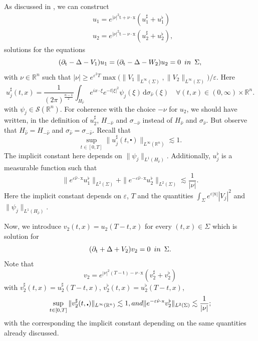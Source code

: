 \documentclass[10pt,a4paper]{amsart}
\newcommand{\R}{\mathbb{R}}
\newcommand{\dd}{\mathrm{d}}
\newcommand{\tm}{\mathrm{t}}
\newcommand{\x}{\mathrm{x}}
\begin{document}
As discussed in , 
we can construct
\begin{align*}
& u_1 = e^{|\nu|^2 \tm + \nu \cdot \x} (u_1^\sharp + u_1^\flat)\\
& u_2 = e^{|\nu|^2 \tm - \nu \cdot \x} (u_2^\sharp + u_2^\flat),
\end{align*}
solutions for the equations
\begin{equation*}
(\partial_\tm - \Delta - V_1) u_1 = (\partial_\tm - \Delta - W_2) u_2 = 0 \enspace \textnormal{in} \enspace \Sigma,
\end{equation*}
with $\nu \in \R^n $ such that 
$|\nu| \geq e^{\varepsilon^2 T} \max\big(\| V_1 \|_{L^\infty (\Sigma)}, \| V_2 \|_{L^\infty (\Sigma)}\big)/\varepsilon$. Here
\begin{equation*}
u_j^\sharp (t, x) = \frac{1}{(2\pi)^\frac{n-1}{2}} \int_{H_{\hat{\nu}}} e^{ix \cdot \xi} e^{- t |\xi|^2} {\psi_j}(\xi) \, \dd \sigma_{\hat{\nu}} (\xi) \quad \forall (t, x) \in (0,\infty) \times \R^n.
\end{equation*}
with $\psi_j \in \mathcal{S}(\R^n)$.
For coherence with the choice $-\nu$ for $u_2$, we should have 
written, in the definition of $u_2^\sharp$, $H_{-\hat \nu}$ and $\sigma_{-\hat \nu}$
instead of $H_{\hat \nu}$ and $\sigma_{\hat \nu}$. But observe that 
$H_{\hat \nu} = H_{-\hat \nu}$ and $\sigma_{\hat \nu} = \sigma_{-\hat \nu}$.
Recall that
\[\sup_{t \in [0, T]} \| u_j^\sharp (t, \centerdot) \|_{L^\infty(\R^n)} \lesssim 1.\]
The implicit constant here depends on $\| \psi_j \|_{L^1(H_{\hat \nu})}$.
Additionally, $u_j^\flat$ is a measurable function such that
\[ \| e^{\varepsilon \hat{\nu} \cdot \x} u_1^\flat \|_{L^2(\Sigma)} + \| e^{- \varepsilon \hat{\nu} \cdot \x} u_2^\flat \|_{L^2(\Sigma)} \lesssim \frac{1}{|\nu|}. \]
Here the implicit constant depends on 
$\varepsilon$, $T$ and the quantities $\int_\Sigma e^{ \varepsilon |\x|} |V_j|^2$ and
$\| \psi_j \|_{L^1(H_{\hat \nu})}$.

Now, we introduce $v_2(t, x) = u_2(T-t,x)$ for every $(t, x) \in \Sigma$
which is solution for 
\begin{equation*}
(\partial_\tm + \Delta + V_2) v_2 = 0 \enspace \textnormal{in} \enspace \Sigma.
\end{equation*}
Note that
\[v_2 = e^{|\nu|^2 (T - \tm) - \nu \cdot \x} (v_2^\sharp + v_2^\flat)\]
with $v_2^\sharp (t, x) = u_2^\sharp (T-t,x)$, $v_2^\flat (t, x) = u_2^\flat (T-t,x)$,
\[ \sup_{t \in [0, T]} \| v_2^\sharp (t, \centerdot) \|_{L^\infty(\R^n)} \lesssim 1, \textnormal{ and } \| e^{- \varepsilon \hat{\nu} \cdot \x} v_2^\flat \|_{L^2(\Sigma)} \lesssim \frac{1}{|\nu|}; \]
with the corresponding the implicit constant depending on the same quantities already 
discussed.
\end{document}
